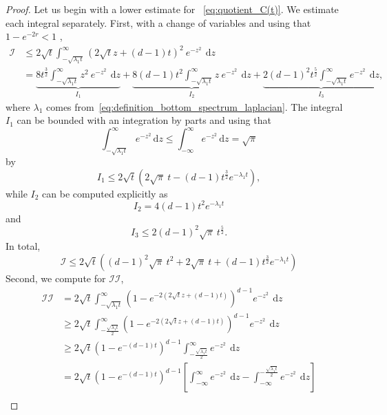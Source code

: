 \documentclass[12pt,longbibliography]{article}
\def\d{\,\mathrm{d}}
\def\d{\,\mathrm{d}}
\theoremstyle{definition}
\theoremstyle{remark}
\theoremstyle{example}
\begin{document}
\begin{proof}
	Let us begin with a lower estimate  for ~\eqref{eq:quotient_C(t)}.
	We estimate each integral separately. First, with a change of variables and using that $1-e^{-2r}<1$ ,
	\[
	\begin{aligned}
		\mathcal{I} &\leq  2\sqrt{t}\int_{-\sqrt{\lambda_1 t}}^\infty \left(2\sqrt{t}z + (d-1)t\right)^2 \ e^{-z^2}\ \d z\\[10pt]
		& = \underbrace{8t^\frac{3}{2}\int_{-\sqrt{\lambda_1 t}}^\infty z^2 \ e^{-z^2}\ \d z}_{I_1} + \underbrace{8(d-1)t^2 \int_{-\sqrt{\lambda_1 t}}^\infty z \ e^{-z^2}\ \d z}_{I_2} + \underbrace{2 (d-1)^2 t^\frac{5}{2} \int_{-\sqrt{\lambda_1 t}}^\infty  e^{-z^2}\ \d z}_{I_3},
	\end{aligned}
	\]
	where $\lambda_1$ comes from~\eqref{eq:definition_bottom_spectrum_laplacian}. The integral $I_1$ can be bounded with an integration by parts and using that
	\[
	\int_{-\sqrt{\lambda_1 t}}^\infty e^{-z^2}\d z\leq  \int_{-\infty}^\infty e^{-z^2}\d z = \sqrt{\pi}
	\]
	by
	\[
	I_1\leq 2\sqrt{t}\left(2\sqrt{\pi}\ t - (d-1)t^\frac{3}{2}e^{-\lambda_1 t}  \right),
	\]
	while $I_2$ can be computed explicitly as
	\[
	I_2 = 4(d-1)t^2 e^{-\lambda_1 t}
	\]
	and
	\[
	I_3 \leq 2 (d-1)^2 \sqrt{\pi}\  t^\frac{5}{2}.
	\]
	In total,
	\[
	\mathcal{I}\leq 2\sqrt{t}\left((d-1)^2\sqrt{\pi}\ t^2  +2\sqrt{\pi}\ t  + (d-1)t^\frac{3}{2}e^{-\lambda_1 t} \right)
	\]
	Second, we compute for $\mathcal{II}$,
	\[
	\begin{aligned}
		\mathcal{II} &= 2\sqrt{t} \int_{-\sqrt{\lambda_1 t}}^{\infty} \left(1- e^{-2(2\sqrt{t}z+(d-1)t)}\right)^{d-1} e^{-z^2}\ \d z\\[10pt]
		&\geq 2\sqrt{t} \int_{-\frac{\sqrt{\lambda_1 t}}{2}}^{\infty} \left(1- e^{-2(2\sqrt{t}z+(d-1)t)}\right)^{d-1} e^{-z^2}\ \d z\\[10pt]
		& \geq  2\sqrt{t} \left(1- e^{-(d-1)t}\right)^{d-1} \int_{-\frac{\sqrt{\lambda_1 t}}{2}}^{\infty}  e^{-z^2}\ \d z\\[10pt]
		&= 2\sqrt{t} \left(1- e^{-(d-1)t}\right)^{d-1}\left[ \int_{-\infty}^{\infty}  e^{-z^2}\ \d z - \int_{-\infty}^{-\frac{\sqrt{\lambda_1 t}}{2}}  e^{-z^2}\ \d z \right]\\[10pt]

\end{aligned}\]
\end{proof}
\end{document}
